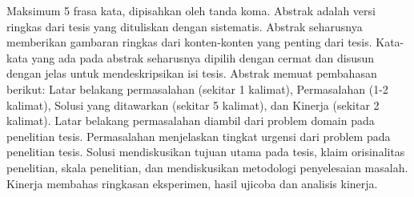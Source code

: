 \begin{abstrak}{Maksimum 5 frasa kata, dipisahkan oleh tanda koma.}
Abstrak adalah versi ringkas dari tesis yang dituliskan dengan sistematis.
Abstrak seharusnya memberikan gambaran ringkas dari konten-konten yang penting
dari tesis. Kata-kata yang ada pada abstrak seharusnya dipilih dengan cermat
dan disusun dengan jelas untuk mendeskripsikan isi tesis. Abstrak memuat
pembahasan berikut: Latar belakang permasalahan (sekitar 1 kalimat),
Permasalahan (1-2 kalimat), Solusi yang ditawarkan (sekitar 5 kalimat), dan
Kinerja (sekitar 2 kalimat). Latar belakang permasalahan diambil dari problem
domain pada penelitian tesis. Permasalahan menjelaskan tingkat urgensi dari
problem pada penelitian tesis. Solusi mendiskusikan tujuan utama pada tesis,
klaim orisinalitas penelitian, skala penelitian, dan mendiskusikan metodologi
penyelesaian masalah. Kinerja membahas ringkasan eksperimen, hasil ujicoba dan
analisis kinerja.
\end{abstrak}

